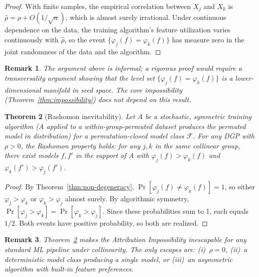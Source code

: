 \documentclass{article}
\newtheorem{theorem}{Theorem}
\newtheorem{remark}[theorem]{Remark}
\begin{document}
\begin{proof}
With finite samples, the empirical correlation between $X_j$ and $X_k$ is $\hat\rho = \rho + O(1/\sqrt{n})$, which is almost surely irrational. Under continuous dependence on the data, the training algorithm's feature utilization varies continuously with $\hat\rho$, so the event $\{\varphi_j(f) = \varphi_k(f)\}$ has measure zero in the joint randomness of the data and the algorithm.
\end{proof}

\begin{remark}
The argument above is informal; a rigorous proof would require a transversality argument showing that the level set $\{\varphi_j(f) = \varphi_k(f)\}$ is a lower-dimensional manifold in seed space. The core impossibility (Theorem~\ref{thm:impossibility}) does not depend on this result.
\end{remark}

\begin{theorem}[Rashomon inevitability]
\label{thm:rashomon-inevitability}
Let $A$ be a stochastic, symmetric training algorithm ($A$ applied to a within-group-permuted dataset produces the permuted model in distribution) for a permutation-closed model class $\mathcal{F}$. For any DGP with $\rho > 0$, the Rashomon property holds: for any $j, k$ in the same collinear group, there exist models $f, f'$ in the support of $A$ with $\varphi_j(f) > \varphi_k(f)$ and $\varphi_k(f') > \varphi_j(f')$.
\end{theorem}

\begin{proof}
By Theorem~\ref{thm:non-degeneracy}, $\Pr[\varphi_j(f) \neq \varphi_k(f)] = 1$, so either $\varphi_j > \varphi_k$ or $\varphi_k > \varphi_j$ almost surely. By algorithmic symmetry, $\Pr[\varphi_j > \varphi_k] = \Pr[\varphi_k > \varphi_j]$. Since these probabilities sum to 1, each equals $1/2$. Both events have positive probability, so both are realized.
\end{proof}

\begin{remark}
Theorem~\ref{thm:rashomon-inevitability} makes the Attribution Impossibility inescapable for any standard ML pipeline under collinearity. The only escapes are: (i)~$\rho = 0$, (ii)~a deterministic model class producing a single model, or (iii)~an asymmetric algorithm with built-in feature preferences.
\end{remark}

\end{document}
